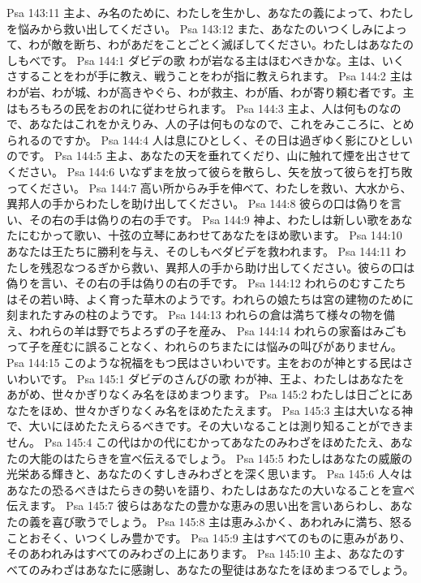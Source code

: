 Psa 143:11  主よ、み名のために、わたしを生かし、あなたの義によって、わたしを悩みから救い出してください。
Psa 143:12  また、あなたのいつくしみによって、わが敵を断ち、わがあだをことごとく滅ぼしてください。わたしはあなたのしもべです。
Psa 144:1  ダビデの歌 わが岩なる主はほむべきかな。主は、いくさすることをわが手に教え、戦うことをわが指に教えられます。
Psa 144:2  主はわが岩、わが城、わが高きやぐら、わが救主、わが盾、わが寄り頼む者です。主はもろもろの民をおのれに従わせられます。
Psa 144:3  主よ、人は何ものなので、あなたはこれをかえりみ、人の子は何ものなので、これをみこころに、とめられるのですか。
Psa 144:4  人は息にひとしく、その日は過ぎゆく影にひとしいのです。
Psa 144:5  主よ、あなたの天を垂れてくだり、山に触れて煙を出させてください。
Psa 144:6  いなずまを放って彼らを散らし、矢を放って彼らを打ち敗ってください。
Psa 144:7  高い所からみ手を伸べて、わたしを救い、大水から、異邦人の手からわたしを助け出してください。
Psa 144:8  彼らの口は偽りを言い、その右の手は偽りの右の手です。
Psa 144:9  神よ、わたしは新しい歌をあなたにむかって歌い、十弦の立琴にあわせてあなたをほめ歌います。
Psa 144:10  あなたは王たちに勝利を与え、そのしもべダビデを救われます。
Psa 144:11  わたしを残忍なつるぎから救い、異邦人の手から助け出してください。彼らの口は偽りを言い、その右の手は偽りの右の手です。
Psa 144:12  われらのむすこたちはその若い時、よく育った草木のようです。われらの娘たちは宮の建物のために刻まれたすみの柱のようです。
Psa 144:13  われらの倉は満ちて様々の物を備え、われらの羊は野でちよろずの子を産み、
Psa 144:14  われらの家畜はみごもって子を産むに誤ることなく、われらのちまたには悩みの叫びがありません。
Psa 144:15  このような祝福をもつ民はさいわいです。主をおのが神とする民はさいわいです。
Psa 145:1  ダビデのさんびの歌 わが神、王よ、わたしはあなたをあがめ、世々かぎりなくみ名をほめまつります。
Psa 145:2  わたしは日ごとにあなたをほめ、世々かぎりなくみ名をほめたたえます。
Psa 145:3  主は大いなる神で、大いにほめたたえらるべきです。その大いなることは測り知ることができません。
Psa 145:4  この代はかの代にむかってあなたのみわざをほめたたえ、あなたの大能のはたらきを宣べ伝えるでしょう。
Psa 145:5  わたしはあなたの威厳の光栄ある輝きと、あなたのくすしきみわざとを深く思います。
Psa 145:6  人々はあなたの恐るべきはたらきの勢いを語り、わたしはあなたの大いなることを宣べ伝えます。
Psa 145:7  彼らはあなたの豊かな恵みの思い出を言いあらわし、あなたの義を喜び歌うでしょう。
Psa 145:8  主は恵みふかく、あわれみに満ち、怒ることおそく、いつくしみ豊かです。
Psa 145:9  主はすべてのものに恵みがあり、そのあわれみはすべてのみわざの上にあります。
Psa 145:10  主よ、あなたのすべてのみわざはあなたに感謝し、あなたの聖徒はあなたをほめまつるでしょう。
